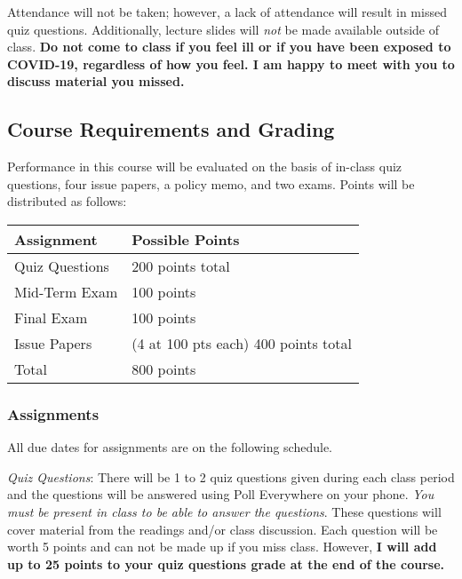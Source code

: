 Attendance will not be taken; however, a lack of attendance will result
in missed quiz questions. Additionally, lecture slides will \emph{not}
be made available outside of class. \textbf{Do not come to class if you
feel ill or if you have been exposed to COVID-19, regardless of how you
feel. I am happy to meet with you to discuss material you missed.}

\hypertarget{course-requirements-and-grading}{%
\subsection{Course Requirements and
Grading}\label{course-requirements-and-grading}}

Performance in this course will be evaluated on the basis of in-class
quiz questions, four issue papers, a policy memo, and two exams. Points
will be distributed as follows:

\vspace{0.1in}
\begin{tabular}{ l l}
\hline
Assignment & Possible Points \\ 
\hline
Quiz Questions & 200 points total \\
Mid-Term Exam & 100 points \\ 
Final Exam & 100 points \\
Issue Papers & (4 at 100 pts each) 400 points total \\
\hline
Total &  800 points \\
\hline
\end{tabular}

\hypertarget{assignments}{%
\subsubsection{Assignments}\label{assignments}}

All due dates for assignments are on the following schedule.

\vspace{0.1in}

\noindent \emph{Quiz Questions}: There will be 1 to 2 quiz questions
given during each class period and the questions will be answered using
Poll Everywhere on your phone. \emph{You must be present in class to be
able to answer the questions}. These questions will cover material from
the readings and/or class discussion. Each question will be worth 5
points and can not be made up if you miss class. However, \textbf{I will
add up to 25 points to your quiz questions grade at the end of the
course.}

